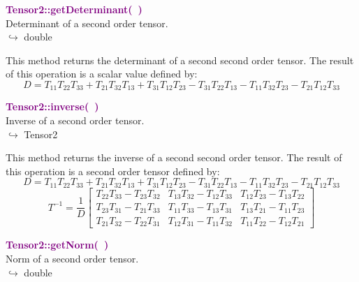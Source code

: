 \textcolor{purple}{\textbf{Tensor2::getDeterminant(~)}}\label{Tensor2::getDeterminant()}\\
Determinant of a second order tensor.\\ \hspace*{10mm}$\hookrightarrow$ double

This method returns the determinant of a second second order tensor.
The result of this operation is a scalar value defined by:
\begin{equation*}
D = T_{11} T_{22} T_{33} + T_{21} T_{32} T_{13} + T_{31} T_{12} T_{23} - T_{31} T_{22} T_{13} - T_{11} T_{32} T_{23} - T_{21} T_{12} T_{33}
\end{equation*}

\textcolor{purple}{\textbf{Tensor2::inverse(~)}}\label{Tensor2::inverse()}\\
Inverse of a second order tensor.\\ \hspace*{10mm}$\hookrightarrow$ Tensor2

This method returns the inverse of a second second order tensor.
The result of this operation is a second order tensor defined by:
\begin{equation*}
D = T_{11} T_{22} T_{33} + T_{21} T_{32} T_{13} + T_{31} T_{12} T_{23} - T_{31} T_{22} T_{13} - T_{11} T_{32} T_{23} - T_{21} T_{12} T_{33}
\end{equation*}
\begin{equation*}
T^{-1} = \frac {1}{D} \left[\begin{array}{ccc}
  T_{22}T_{33}-T_{23}T_{32}&T_{13}T_{32}-T_{12}T_{33}&T_{12}T_{23}-T_{13}T_{22}\\
  T_{23}T_{31}-T_{21}T_{33}&T_{11}T_{33}-T_{13}T_{31}&T_{13}T_{21}-T_{11}T_{23}\\
  T_{21}T_{32}-T_{22}T_{31}&T_{12}T_{31}-T_{11}T_{32}&T_{11}T_{22}-T_{12}T_{21}
  \end{array}
  \right]
\end{equation*}

\textcolor{purple}{\textbf{Tensor2::getNorm(~)}}\label{Tensor2::getNorm()}\\
Norm of a second order tensor.\\ \hspace*{10mm}$\hookrightarrow$ double

